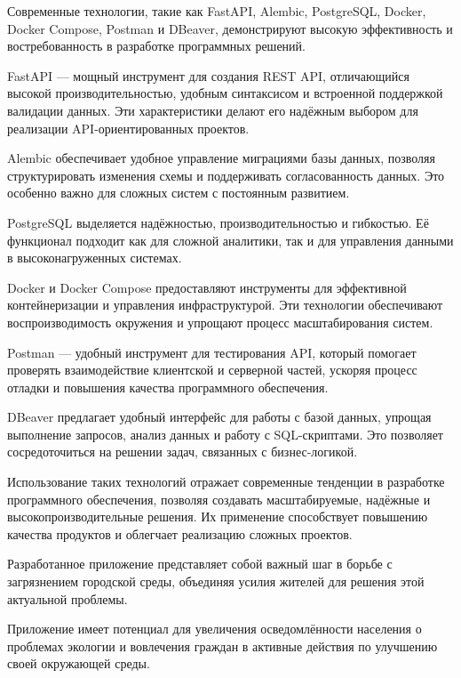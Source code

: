 \documentclass[otchet]{SCWorks}
\begin{document}
\conclusion

Современные технологии, такие как FastAPI, Alembic, PostgreSQL, Docker, Docker 
Compose, Postman и DBeaver, демонстрируют высокую эффективность и 
востребованность в разработке программных решений.

FastAPI — мощный инструмент для создания REST API, отличающийся высокой 
производительностью, удобным синтаксисом и встроенной поддержкой валидации 
данных. Эти характеристики делают его надёжным выбором для реализации 
API-ориентированных проектов.

Alembic обеспечивает удобное управление миграциями базы данных, позволяя 
структурировать изменения схемы и поддерживать согласованность данных. 
Это особенно важно для сложных систем с постоянным развитием.

PostgreSQL выделяется надёжностью, производительностью и гибкостью. Её 
функционал подходит как для сложной аналитики, так и для управления данными 
в высоконагруженных системах.

Docker и Docker Compose предоставляют инструменты для эффективной 
контейнеризации и управления инфраструктурой. Эти технологии обеспечивают 
воспроизводимость окружения и упрощают процесс масштабирования систем.

Postman — удобный инструмент для тестирования API, который помогает 
проверять взаимодействие клиентской и серверной частей, ускоряя процесс 
отладки и повышения качества программного обеспечения.

DBeaver предлагает удобный интерфейс для работы с базой данных, упрощая 
выполнение запросов, анализ данных и работу с SQL-скриптами. Это позволяет 
сосредоточиться на решении задач, связанных с бизнес-логикой.

Использование таких технологий отражает современные тенденции в разработке 
программного обеспечения, позволяя создавать масштабируемые, надёжные и 
высокопроизводительные решения. Их применение способствует повышению качества 
продуктов и облегчает реализацию сложных проектов.

Разработанное приложение представляет собой важный шаг в борьбе 
с загрязнением городской среды, объединяя усилия жителей для решения этой 
актуальной проблемы.

Приложение имеет потенциал для увеличения осведомлённости населения о 
проблемах экологии и вовлечения граждан в активные действия по улучшению 
своей окружающей среды.

\nocite{*}



\end{document}

